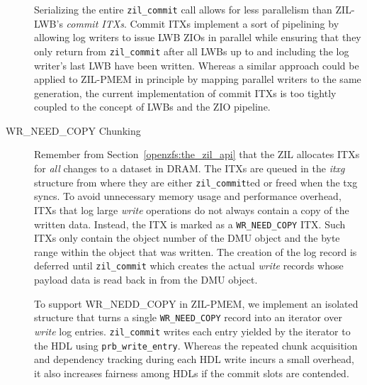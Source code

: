 \documentclass[12pt,a4paper,twoside]{book}
\begin{document}
\begin{description}
        Serializing the entire \lstinline{zil_commit} call allows for less parallelism than ZIL-LWB's \textit{commit ITXs}.
        Commit ITXs implement a sort of pipelining by allowing log writers to issue LWB ZIOs in parallel while ensuring that they only return from \lstinline{zil_commit} after all LWBs up to and including the log writer's last LWB have been written.
        Whereas a similar approach could be applied to ZIL-PMEM in principle by mapping parallel writers to the same generation, the current implementation of commit ITXs is too tightly coupled to the concept of LWBs and the ZIO pipeline.

    \item[WR\_NEED\_COPY Chunking]
        Remember from Section~\ref{openzfs:the_zil_api} that the ZIL allocates ITXs for \textit{all} changes to a dataset in DRAM.
        The ITXs are queued in the \textit{itxg} structure from where they are either \lstinline{zil_commit}ted or freed when the txg syncs.
        To avoid unnecessary memory usage and performance overhead, ITXs that log large \textit{write} operations do not always contain a copy of the written data.
        Instead, the ITX is marked as a \lstinline{WR_NEED_COPY} ITX.
        Such ITXs only contain the object number of the DMU object and the byte range within the object that was written.
        The creation of the log record is deferred until \lstinline{zil_commit} which creates the actual \textit{write} records whose payload data is read back in from the DMU object.

        To support WR\_NEDD\_COPY in ZIL-PMEM, we implement an isolated structure that turns a single \lstinline{WR_NEED_COPY} record into an iterator over \textit{write} log entries.
        \lstinline{zil_commit} writes each entry yielded by the iterator to the HDL using \lstinline{prb_write_entry}.
        Whereas the repeated chunk acquisition and dependency tracking during each HDL write incurs a small overhead, it also increases fairness among HDLs if the commit slots are contended.

\end{description}
\end{document}

